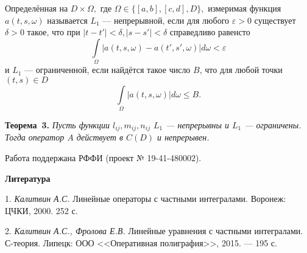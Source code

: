 Определённая на $D\times\Omega,$ где $\Omega\in\{[a,b], [c,d], D\},$ измеримая функция $a(t,s,\omega)$ называется $L_1$ --- непрерывной, если для любого $\varepsilon>0$ существует $\delta>0$ такое, что при $|t-t'|<\delta, |s-s'|<\delta$ справедливо равенсто
$$
\int\limits_\Omega|a(t,s,\omega)-a(t',s',\omega)|d\omega<\varepsilon
$$
и $L_1$ --- ограниченной, если найдётся такое число $B$, что для любой точки
$(t,s)\in D$
$$
\int\limits_\Omega|a(t,s,\omega)|d\omega\le B.
$$

\textbf{Теорема~3.}
{\it Пусть функции $l_{ij},m_{ij},n_{ij}$ $L_1$ --- непрерывны и $L_1$ --- ограничены.
Тогда оператор $A$ действует в $C(D)$ и непрерывен.}

Работа поддержана РФФИ (проект № 19-41-480002).


\smallskip \centerline {\bf Литература} \nopagebreak

1. {\it Калитвин А.С.} Линейные операторы с частными интегралами. Воронеж: ЦЧКИ, 2000. 252 с.

2. {\it Калитвин А.С., Фролова Е.В.} Линейные уравнения с частными интегралами. С-теория. Липецк: ООО <<Оперативная полиграфия>>, 2015. — 195 с.
